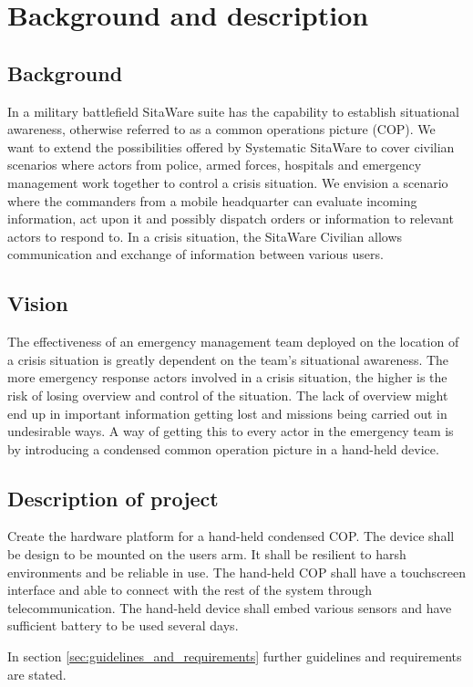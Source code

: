 \chapter{Background and description}
\section{Background}
In a military battlefield SitaWare suite has the capability to establish situational awareness, otherwise referred to as a common operations picture (COP). We want to extend the possibilities offered by Systematic SitaWare to cover civilian scenarios where
actors from police, armed forces, hospitals and emergency management work together to
control a crisis situation. We envision a scenario where the commanders from a mobile
headquarter can evaluate incoming information, act upon it and possibly dispatch orders
or information to relevant actors to respond to.
In a crisis situation, the SitaWare Civilian allows communication and exchange of information between various users. 

\section{Vision}
The effectiveness of an emergency management team deployed on the location of a crisis
situation is greatly dependent on the team’s situational awareness. The more emergency
response actors involved in a crisis situation, the higher is the risk of losing overview and
control of the situation. The lack of overview might end up in important information
getting lost and missions being carried out in undesirable ways.
A way of getting this to every actor in the emergency team is by introducing a condensed common operation picture in a hand-held device. 

\section{Description of project}
Create the hardware platform for a hand-held condensed COP. The device shall be design to be mounted on the users arm. It shall be resilient to harsh environments and be reliable in use. The hand-held COP shall have a touchscreen interface and able to connect with the rest of the system through telecommunication.
The hand-held device shall embed various sensors and have sufficient battery to be used several days. 

In section \ref{sec:guidelines_and_requirements} further guidelines and requirements are stated. 


